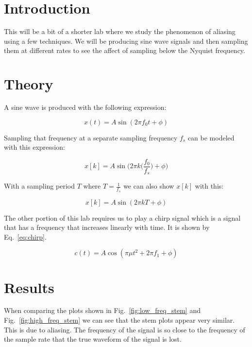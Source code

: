 \documentclass[11pt]{texMemo-gibbons}
\begin{document}
\maketitle

\section{Introduction}
\label{sec:introduction}

This will be a bit of a shorter lab where we study the
phenomenon of aliasing using a few techniques. We will
be producing sine wave signals and then sampling them 
at different rates to see the affect of sampling below
the Nyquist frequency.

\section{Theory}
\label{sec:theory}

A sine wave is produced with the following expression:

\[
  x(t) = A \sin (2\pi f_0 t + \phi)
\]

Sampling that frequency at a separate sampling frequency $f_s$ can be modeled
with this expression:

\[
  x[k] = A \sin \Big( 2\pi k \Big( \frac{f_0}{f_s} \Big)  + \phi \Big)
\]

With a sampling period $T$ where $T=\frac{1}{f_s}$ we can also show 
$x[k]$ with this:

\begin{equation}
  x[k] = A \sin ( 2\pi k T + \phi )
  \label{eq:sampling_sine}
\end{equation}

The other portion of this lab requires us to play a chirp signal
which is a signal that has a frequency that increases linearly
with time. It is shown by Eq.~\ref{eq:chirp}.

\begin{equation}
  c(t) = A \cos (\pi \mu t^2 + 2\pi f_1 + \phi) 
  \label{eq:chirp}
\end{equation}

\section{Results}
\label{sec:results}

When comparing the plots shown in Fig.~\ref{fig:low_freq_stem}
and Fig.~\ref{fig:high_freq_stem} we can see that the
stem plots appear very similar. This is due to aliasing.
The frequency of the signal is so close to the frequency
of the sample rate that the true waveform of the signal
is lost.
\end{document}

